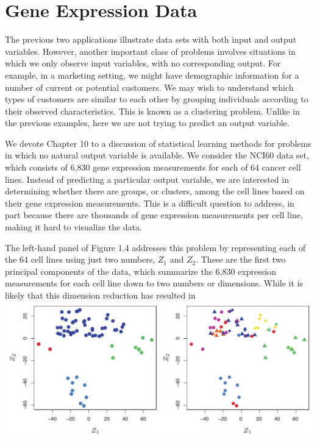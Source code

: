 \documentclass[10pt]{article}
\begin{document}
\section*{Gene Expression Data}
The previous two applications illustrate data sets with both input and output variables. However, another important class of problems involves situations in which we only observe input variables, with no corresponding output. For example, in a marketing setting, we might have demographic information for a number of current or potential customers. We may wish to understand which types of customers are similar to each other by grouping individuals according to their observed characteristics. This is known as a clustering problem. Unlike in the previous examples, here we are not trying to predict an output variable.

We devote Chapter 10 to a discussion of statistical learning methods for problems in which no natural output variable is available. We consider the NCI60 data set, which consists of 6,830 gene expression measurements for each of 64 cancer cell lines. Instead of predicting a particular output variable, we are interested in determining whether there are groups, or clusters, among the cell lines based on their gene expression measurements. This is a difficult question to address, in part because there are thousands of gene expression measurements per cell line, making it hard to visualize the data.

The left-hand panel of Figure 1.4 addresses this problem by representing each of the 64 cell lines using just two numbers, $Z_{1}$ and $Z_{2}$. These are the first two principal components of the data, which summarize the 6,830 expression measurements for each cell line down to two numbers or dimensions. While it is likely that this dimension reduction has resulted in\\
\includegraphics[max width=\textwidth, center]{2025_05_05_efe77898333945044de4g-020}
\end{document}
